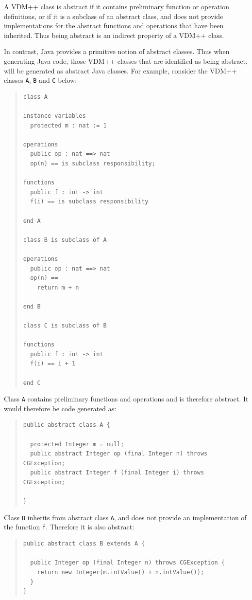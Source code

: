 \documentclass[\pformat,11pt]{article}
\begin{document}
A VDM++ class is abstract if it contains preliminary function or
operation definitions, or if it is a subclass of an abstract class,
and does not provide implementations for the abstract functions and
operations that have been inherited. Thus being abstract is an
indirect property of a VDM++ class. 

In contrast, Java provides a primitive notion of abstract
classes. Thus when generating Java code, those VDM++ classes that are
identified as being abstract, will be generated as abstract Java
classes. For example, consider the VDM++ classes \texttt{A},
\texttt{B} and \texttt{C} below:

\begin{quote}
\begin{verbatim}
class A

instance variables
  protected m : nat := 1

operations
  public op : nat ==> nat
  op(n) == is subclass responsibility;

functions
  public f : int -> int
  f(i) == is subclass responsibility

end A

class B is subclass of A

operations
  public op : nat ==> nat
  op(n) ==
    return m + n

end B

class C is subclass of B

functions
  public f : int -> int
  f(i) == i + 1

end C
\end{verbatim}
\end{quote}
Class \texttt{A} contains preliminary functions and operations and is
therefore abstract. It would therefore be code generated as:
\begin{quote}
\begin{verbatim}
public abstract class A {
 
  protected Integer m = null;
  public abstract Integer op (final Integer n) throws CGException;
  public abstract Integer f (final Integer i) throws CGException;
 
} 
\end{verbatim}
\end{quote}
Class \texttt{B} inherits from abstract class \texttt{A}, and does not
provide an implementation of the function \texttt{f}. Therefore it is
also abstract:

\begin{quote}
\begin{verbatim}
public abstract class B extends A {

  public Integer op (final Integer n) throws CGException {
    return new Integer(m.intValue() + n.intValue());
  }
}
\end{verbatim}
\end{quote}
\end{document}
